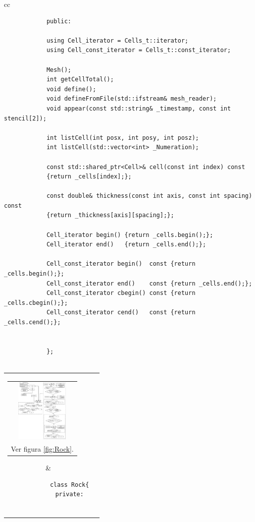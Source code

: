 \begin{appendix}
\begin{table}[h]
\begin{tabular}{cc}
\begin{tiny}
\begin{lstlisting}
			public:
			
			using Cell_iterator = Cells_t::iterator;
			using Cell_const_iterator = Cells_t::const_iterator;
			
			Mesh();
			int getCellTotal();
			void define();
			void defineFromFile(std::ifstream& mesh_reader);
			void appear(const std::string& _timestamp, const int stencil[2]);
			
			int listCell(int posx, int posy, int posz);
			int listCell(std::vector<int> _Numeration);
			
			const std::shared_ptr<Cell>& cell(const int index) const 
			{return _cells[index];};
			
			const double& thickness(const int axis, const int spacing) const 
			{return _thickness[axis][spacing];};
			
			Cell_iterator begin() {return _cells.begin();};
			Cell_iterator end()   {return _cells.end();};
			
			Cell_const_iterator begin()  const {return _cells.begin();};
			Cell_const_iterator end()    const {return _cells.end();};
			Cell_const_iterator cbegin() const {return _cells.cbegin();};
			Cell_const_iterator cend()   const {return _cells.cend();};
			
			
			};
			
			\end{lstlisting}
		\end{tiny}
	\end{tabular}
	\label{tab:MeshCode}
	\caption[Traducción a código del concepto Malla.]{Traducción a código del concepto Malla. Los autores.}
\end{table}



\begin{table}[h]
	\centering
	\begin{tabular}{cc}
		\parbox[c]{1em}{
			\begin{tabular}[c]{@{}c@{}}\includegraphics[width=1in]{Fig/Rock.pdf}\\ Ver figura \ref{fig:Rock}.\end{tabular}
		}
		&
		\begin{tiny}
			\begin{lstlisting}
			class Rock{
			private:
			

\end{lstlisting}
\end{tiny}
\end{tabular}
\end{table}
\end{appendix}
